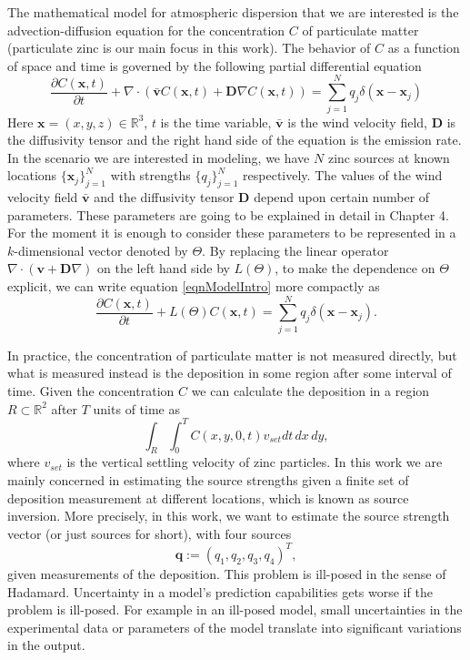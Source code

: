 \documentclass{sfuthesis}
\newcommand{\q}{\textbf{q}}
\newcommand{\x}{\textbf{x}}
\newcommand{\vv}{\textbf{v}}
\newcommand{\dv}{\nabla\cdot}
\begin{document}
The mathematical model for atmospheric dispersion that we are 
interested is the advection-diffusion equation
for the concentration $C$ of particulate matter (particulate zinc is our main focus
in this work). The behavior of $C$
as a function of space and time is governed by 
the following partial differential equation
\begin{equation}\label{eqnModelIntro}
\frac{\partial C(\x,t)}{\partial t}+\dv(\bar{\vv}C(\x,t)+\textbf{D}\nabla C(\x,t))=\sum_{j=1}^{N}q_{j}\delta(\x-\x_{j})
\end{equation}
Here $\x=(x,y,z)\in\mathbb{R}^{3}$, $t$ is the time variable, $\bar{\vv}$  is the wind velocity field, $\textbf{D}$
is the diffusivity tensor and the right hand side of the equation is the emission rate. In the scenario
we are interested in modeling, we have $N$ zinc sources at known locations $\{\x_{j}\}_{j=1}^{N}$ 
with strengths $\{q_{j}\}_{j=1}^{N}$ respectively. The values of the wind velocity field $\bar{\vv}$
and the diffusivity tensor $\textbf{D}$ depend upon certain number of parameters. These parameters are going
to be explained in detail in Chapter 4. For the moment it is enough to consider these
parameters to be represented in a $k$-dimensional vector denoted by  $\Theta$.
By replacing the linear operator $\dv(\vv+\textbf{D}\nabla)$ on the left hand side by $L(\Theta)$, to make the dependence on $\Theta$ explicit, we can write equation \eqref{eqnModelIntro}
more compactly as
\begin{equation}\label{eqnParamtric}
\frac{\partial C(\x,t)}{\partial t}+L(\Theta)C(\x,t)=\sum_{j=1}^{N}q_{j}\delta(\x-\x_{j}).
\end{equation}

In practice, the concentration of particulate matter is not measured directly, but
what is measured instead is the deposition in some region after some interval of time. Given the concentration $C$
we can calculate the deposition  in a region $R\subset\mathbb{R}^{2}$ after $T$ units of time as
\begin{equation*}
\int_{R}\int_{0}^{T} C(x,y,0,t)v_{set}dt\,dx\,dy,
\end{equation*}
where $v_{set}$ is the vertical settling velocity of zinc particles. 
In this work we are mainly concerned  in estimating the source strengths
given a finite set of deposition measurement at different locations, which
is known as source inversion.
More precisely, in this work, we want to estimate the source strength vector (or just sources for short), with four sources
\begin{equation*}
\q:=(q_{1},q_{2},q_{3},q_{4})^{T},
\end{equation*}
given measurements of the deposition.
This problem is ill-posed\cite{enting1990inverse} in the sense of Hadamard.
Uncertainty in a model's prediction capabilities gets worse if the problem
is ill-posed. For example in an ill-posed model, small uncertainties
in the experimental data or parameters of the model translate
into significant variations in the output.
\end{document}
